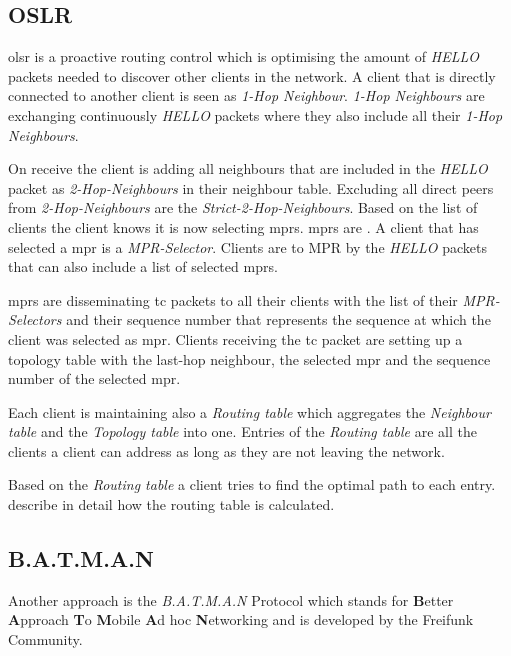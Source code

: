 \subsection{OSLR}
\gls{olsr} is a proactive routing control which is optimising the amount of \textit{HELLO} packets needed to discover other clients in the network.
A client that is directly connected to another client is seen as \textit{1-Hop Neighbour}. \textit{1-Hop Neighbours} are exchanging continuously \textit{HELLO} packets where they also include all their \textit{1-Hop Neighbours}.

On receive the client is adding all neighbours that are included in the \textit{HELLO} packet as \textit{2-Hop-Neighbours} in their neighbour table. Excluding all direct peers from \textit{2-Hop-Neighbours} are the \textit{Strict-2-Hop-Neighbours}.
Based on the list of clients the client knows it is now selecting \glspl{mpr}. \Glspl{mpr} are \cite[\S1.4]{rfc-oslr}. A client that has selected a \gls{mpr} is a \textit{MPR-Selector}. Clients are  to \gls{MPR} by the \textit{HELLO} packets that can also include a list of selected \glspl{mpr}.

\Glspl{mpr} are disseminating \gls{tc} packets to all their clients with the list of their \textit{MPR-Selectors} and their sequence number that represents the sequence at which the client was selected as \gls{mpr}.
Clients receiving the \gls{tc} packet are setting up a topology table with the last-hop neighbour, the selected \gls{mpr} and the sequence number of the selected \gls{mpr}.

Each client is maintaining also a \textit{Routing table} which aggregates the \textit{Neighbour table} and the \textit{Topology table} into one. Entries of the \textit{Routing table} are all the clients a client can address as long as they are not leaving the network. 

Based on the \textit{Routing table} a client tries to find the optimal path to each entry. \citet[\S4.4]{jacquet_muhlethaler_clausen_laouiti_qayyum_viennot} describe in detail how the routing table is calculated.

\subsection{B.A.T.M.A.N}
Another approach is the \textit{B.A.T.M.A.N} Protocol which stands for \textbf{B}etter \textbf{A}pproach \textbf{T}o \textbf{M}obile \textbf{A}d hoc \textbf{N}etworking and is developed by the Freifunk Community.

